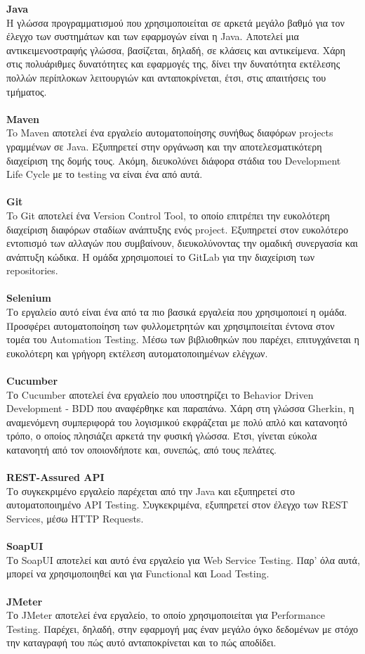 \textbf{Java}\\
Η γλώσσα προγραμματισμού που χρησιμοποιείται σε αρκετά μεγάλο βαθμό για τον έλεγχο των συστημάτων και των εφαρμογών είναι η Java. Αποτελεί μια αντικειμενοστραφής γλώσσα, βασίζεται, δηλαδή, σε κλάσεις και αντικείμενα. Χάρη στις πολυάριθμες δυνατότητες και εφαρμογές της, δίνει την δυνατότητα εκτέλεσης πολλών περίπλοκων λειτουργιών και ανταποκρίνεται, έτσι, στις απαιτήσεις του τμήματος.\\ \\
\textbf{Maven}\\
To Maven αποτελεί ένα εργαλείο αυτοματοποίησης συνήθως διαφόρων projects γραμμένων σε Java. Εξυπηρετεί στην οργάνωση και την αποτελεσματικότερη διαχείριση της δομής τους. Ακόμη, διευκολύνει διάφορα στάδια του Development Life Cycle με το testing να είναι ένα από αυτά.\\ \\
\textbf{Git}\\
To Git αποτελεί ένα Version Control Tool, το οποίο επιτρέπει την ευκολότερη διαχείριση διαφόρων σταδίων ανάπτυξης ενός project. Εξυπηρετεί στον ευκολότερο εντοπισμό των αλλαγών που συμβαίνουν, διευκολύνοντας την ομαδική συνεργασία και ανάπτυξη κώδικα. Η ομάδα χρησιμοποιεί το GitLab για την διαχείριση των repositories.\\ \\
\textbf{Selenium}\\
Το εργαλείο αυτό είναι ένα από τα πιο βασικά εργαλεία που χρησιμοποιεί η ομάδα. Προσφέρει αυτοματοποίηση των φυλλομετρητών και χρησιμποιείται έντονα στον τομέα του Automation Testing. Μέσω των βιβλιοθηκών που παρέχει, επιτυγχάνεται η ευκολότερη και γρήγορη εκτέλεση αυτοματοποιημένων ελέγχων.\\ \\
\textbf{Cucumber}\\
Το Cucumber αποτελεί ένα εργαλείο που υποστηρίζει το Behavior Driven Development - BDD που αναφέρθηκε και παραπάνω. Χάρη στη γλώσσα Gherkin, η αναμενόμενη συμπεριφορά του λογισμικού εκφράζεται με πολύ απλό και κατανοητό τρόπο, ο οποίος πλησιάζει αρκετά την φυσική γλώσσα. Έτσι, γίνεται εύκολα κατανοητή από τον οποιονδήποτε και, συνεπώς, από τους πελάτες. \\ \\
\textbf{REST-Assured API}\\
Το συγκεκριμένο εργαλείο παρέχεται από την Java και εξυπηρετεί στο αυτοματοποιημένο API Testing. Συγκεκριμένα, εξυπηρετεί στον έλεγχο των REST Services, μέσω HTTP Requests.\\ \\ 
\textbf{SoapUI}\\
Το SoapUI αποτελεί και αυτό ένα εργαλείο για Web Service Testing. Παρ' όλα αυτά, μπορεί να χρησιμοποιηθεί και για Functional και Load Testing.\\ \\
\textbf{JMeter}\\
Το JMeter αποτελεί ένα εργαλείο, το οποίο χρησιμοποιείται για Performance Testing. Παρέχει, δηλαδή, στην εφαρμογή μας έναν μεγάλο όγκο δεδομένων με στόχο την καταγραφή του πώς αυτό ανταποκρίνεται και το πώς αποδίδει.\\ \\